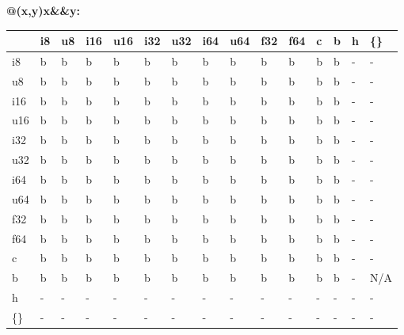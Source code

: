 \textbf{@(x,y)x\&\&y:}
\begin{scriptsize}\begin{tt}\begin{center}\vspace{-.3cm}\begin{tabular}{|m{.65cm}||m{.65cm}|m{.65cm}|m{.65cm}|m{.65cm}|m{.65cm}|m{.65cm}|m{.65cm}|m{.65cm}|m{.65cm}|m{.65cm}|m{.65cm}|m{.65cm}|m{.65cm}|m{.65cm}|}\hline 
&i8&u8&i16&u16&i32&u32&i64&u64&f32&f64&c&b&h&\{\}\\ \hline \hline
i8&b&b&b&b&b&b&b&b&b&b&b&b&-&-\\ \hline
u8&b&b&b&b&b&b&b&b&b&b&b&b&-&-\\ \hline
i16&b&b&b&b&b&b&b&b&b&b&b&b&-&-\\ \hline
u16&b&b&b&b&b&b&b&b&b&b&b&b&-&-\\ \hline
i32&b&b&b&b&b&b&b&b&b&b&b&b&-&-\\ \hline
u32&b&b&b&b&b&b&b&b&b&b&b&b&-&-\\ \hline
i64&b&b&b&b&b&b&b&b&b&b&b&b&-&-\\ \hline
u64&b&b&b&b&b&b&b&b&b&b&b&b&-&-\\ \hline
f32&b&b&b&b&b&b&b&b&b&b&b&b&-&-\\ \hline
f64&b&b&b&b&b&b&b&b&b&b&b&b&-&-\\ \hline
c&b&b&b&b&b&b&b&b&b&b&b&b&-&-\\ \hline
b&b&b&b&b&b&b&b&b&b&b&b&b&-&N/A\\ \hline
h&-&-&-&-&-&-&-&-&-&-&-&-&-&-\\ \hline
\{\}&-&-&-&-&-&-&-&-&-&-&-&-&-&-\\ \hline
\end{tabular}\end{center}\end{tt}\end{scriptsize} 

